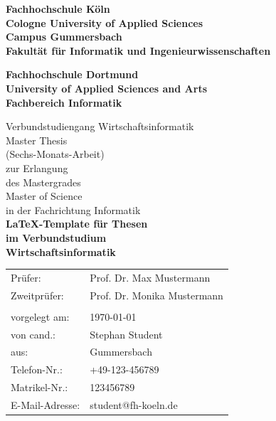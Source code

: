 \documentclass[12pt,oneside,a4paper,bibtotoc,liststotoc]{scrreprt}
\begin{document}
\begin{titlepage} 
\begin{center}
\textbf{\Large Fachhochschule Köln\\
Cologne University of Applied Sciences\\[0.1cm]
\normalsize Campus Gummersbach\\
Fakultät für Informatik und Ingenieurwissenschaften\\[0.5cm]}

\textbf{\Large Fachhochschule Dortmund\\
University of Applied Sciences and Arts\\[0.1cm]
\normalsize Fachbereich Informatik\\[0.5cm]}
 
\Large Verbundstudiengang Wirtschaftsinformatik\\[0.5cm]

\large Master Thesis\\[0.1cm]
(Sechs-Monats-Arbeit) \\[0.1cm] zur Erlangung \\[0.1cm] des Mastergrades \\[0.1cm] \glqq Master of Science\grqq \\[0.1cm] in der Fachrichtung Informatik \\[1.5cm]
  
{ \huge \bfseries \LaTeX-Template für Thesen\\[0.1cm]
        im Verbundstudium\\[0.5cm]
        Wirtschaftsinformatik}\\

\vfill

\begin{table}[h]
\centering
\begin{tabular}{ll}
  Prüfer:         & Prof. Dr. Max Mustermann \\
  Zweitprüfer:    & Prof. Dr. Monika Mustermann \\
                  &  \\
  vorgelegt am:   & \today \\
  von cand.:      & Stephan Student \\
  aus:            & Gummersbach \\
  Telefon-Nr.:    & +49-123-456789 \\
  Matrikel-Nr.:   & 123456789 \\
  E-Mail-Adresse: & student@fh-koeln.de
\end{tabular}
\end{table}
\end{center}
\end{titlepage}
\end{document}
